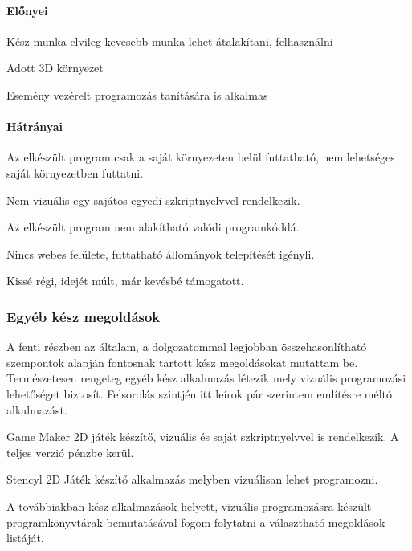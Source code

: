 \documentclass[12pt,a4paper,oneside]{report} %
\begin{document}
\paragraph{Előnyei} 
\begin{compactitem}
	\item Kész munka elvileg kevesebb munka lehet átalakítani, felhasználni
	\item Adott 3D környezet
	\item Esemény vezérelt programozás tanítására is alkalmas
\end{compactitem}
\paragraph{Hátrányai} 
\begin{compactitem}
	\item Az elkészült program csak a saját környezeten belül futtatható, nem lehetséges saját környezetben futtatni.
	\item Nem vizuális egy sajátos egyedi szkriptnyelvvel rendelkezik.
	\item Az elkészült program nem alakítható valódi programkóddá.
	\item Nincs webes felülete, futtatható állományok telepítését igényli.
	\item Kissé régi, idejét múlt, már kevésbé támogatott.
\end{compactitem}

\subsubsection{Egyéb kész megoldások}
A fenti részben az általam, a dolgozatommal legjobban összehasonlítható szempontok alapján fontosnak tartott kész megoldásokat mutattam be. Természetesen rengeteg egyéb kész alkalmazás létezik mely vizuális programozási lehetőséget biztosít. Felsorolás szintjén itt leírok pár szerintem említésre méltó alkalmazást. 
\begin{compactitem}
	\item Game Maker \cite{jenson2016exploring} 2D játék készítő, vizuális és saját szkriptnyelvvel is rendelkezik. A teljes verzió pénzbe kerül.
	\item Stencyl \cite{liu2014making} 2D Játék készítő alkalmazás melyben vizuálisan lehet programozni.
\end{compactitem}
A továbbiakban kész alkalmazások helyett, vizuális programozásra készült programkönyvtárak bemutatásával fogom folytatni a választható megoldások listáját.  
\end{document}
